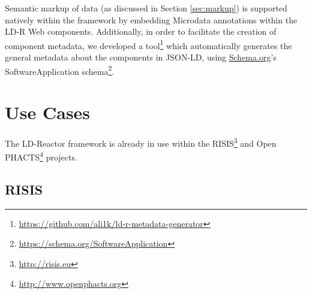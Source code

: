 \documentclass{llncs}
\begin{document}



Semantic markup of data (as discussed in Section \ref{sec:markup}) is supported natively within the framework by embedding Microdata annotations within the LD-R Web components.
Additionally, in order to facilitate the creation of component metadata, we developed a tool\footnote{\url{https://github.com/ali1k/ld-r-metadata-generator}} which automatically generates the general metadata about the components in JSON-LD, using \url{Schema.org}'s SoftwareApplication schema\footnote{\url{https://schema.org/SoftwareApplication}}.


\section{Use Cases}

The LD-Reactor framework is already in use within the RISIS\footnote{\url{http://risis.eu}} and Open PHACTS\footnote{\url{http://www.openphacts.org}} projects.

\subsection{RISIS}
\end{document}
